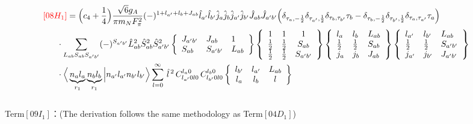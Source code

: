 \documentclass[master]{shnuthesis}
\newcommand{\ap}{a^\prime}
\newcommand{\bp}{b^\prime}
\newcommand{\il}{\!\!\!\!\!\!\!\!\!\!}
\begin{document}
\begin{align}
    &\il {\color{red} [08H_1]} = \Big(c_4+\frac{1}{4}\Big) \frac{\sqrt{6}g_A}{\pi m_N F_{\pi}^2} (-)^{1+l_{\ap}+l_b+J_{ab}} \hat{l}_{\ap}\hat{l}_{\bp}\hat{j}_a\hat{j}_b\hat{j}_{\ap}\hat{j}_{\bp}\hat{J}_{ab}\hat{J}_{\ap\bp} \Big( \delta_{\tau_a,-\frac{1}{2}}\delta_{\tau_{\ap},\frac{1}{2}}\delta_{\tau_b,\tau_{\bp}}\tau_b - \delta_{\tau_b,-\frac{1}{2}}\delta_{\tau_{\bp},\frac{1}{2}}\delta_{\tau_a,\tau_{\ap}}\tau_a \Big) \notag\\
    & \cdot \sum_{L_{ab}S_{ab}S_{\ap\bp}} (-)^{S_{\ap\bp}} \hat{L}_{ab}^2\hat{S}_{ab}^2\hat{S}_{\ap\bp}^2  \left\{\begin{array}{lll} J_{\ap\bp} & J_{ab} & 1 \\ S_{ab} & S_{\ap\bp} & L_{ab} \end{array}\right\}  \left\{\begin{array}{ccc} 1 & 1 & 1 \\ \frac{1}{2} & \frac{1}{2} & S_{ab} \\ \frac{1}{2} & \frac{1}{2} & S_{\ap\bp} \end{array}\right\}  \left\{\begin{array}{lll}l_{a} & l_{b} & L_{ab} \\ \frac{1}{2} & \frac{1}{2} & S_{ab} \\j_{a} & j_{b} & J_{ab} \end{array}\right\}  \left\{\begin{array}{lll} l_{\ap} & l_{\bp} & L_{ab} \\ \frac{1}{2} & \frac{1}{2} & S_{\ap\bp} \\j_{\ap} & j_{\bp} & J_{\ap\bp} \end{array}\right\}  \notag \\
    & \cdot \Big\langle \underbrace{n_a l_a}_{r_1} \underbrace{n_b l_b}_{r_1} \Big| n_{\ap} l_{\ap} n_{\bp} l_{\bp} \Big\rangle \sum_{l=0}^\infty \,\hat{l}^{\,2}\,C_{l_{\ap} 0 l 0}^{l_a 0} \,C_{l_{\bp} 0 l 0}^{l_b 0}  \left\{\begin{array}{ccc} l_{\bp} & l_{\ap} & L_{ab} \\ l_a & l_b & l \end{array}\right\}
\end{align}
\,\\
{\color{red}Term$[09I_1]$：}(The derivation follows the same methodology as Term$[04D_1]$)
\end{document}
